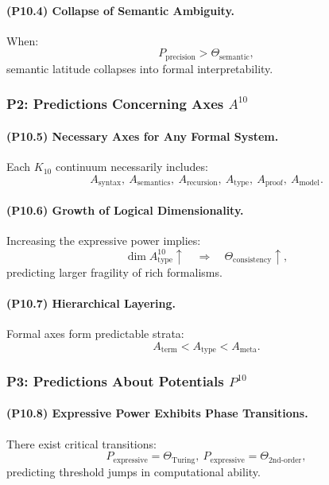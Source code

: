 \paragraph{(P10.4) Collapse of Semantic Ambiguity.}
When:
\[
P_{\mathrm{precision}} > \Theta_{\mathrm{semantic}},
\]
semantic latitude collapses into formal interpretability.

\subsubsection{P2: Predictions Concerning Axes $A^{10}$}

\paragraph{(P10.5) Necessary Axes for Any Formal System.}
Each $K_{10}$ continuum necessarily includes:
\[
A_{\mathrm{syntax}},\
A_{\mathrm{semantics}},\
A_{\mathrm{recursion}},\
A_{\mathrm{type}},\
A_{\mathrm{proof}},\
A_{\mathrm{model}}.
\]

\paragraph{(P10.6) Growth of Logical Dimensionality.}
Increasing the expressive power implies:
\[
\dim A_{\mathrm{type}}^{10} \uparrow \quad
\Rightarrow \quad
\Theta_{\mathrm{consistency}} \uparrow,
\]
predicting larger fragility of rich formalisms.

\paragraph{(P10.7) Hierarchical Layering.}
Formal axes form predictable strata:
\[
A_{\mathrm{term}} < A_{\mathrm{type}} < A_{\mathrm{meta}}.
\]

\subsubsection{P3: Predictions About Potentials $P^{10}$}

\paragraph{(P10.8) Expressive Power Exhibits Phase Transitions.}
There exist critical transitions:
\[
P_{\mathrm{expressive}} = \Theta_{\mathrm{Turing}},\
P_{\mathrm{expressive}} = \Theta_{\mathrm{2nd\mbox{-}order}},
\]
predicting threshold jumps in computational ability.


